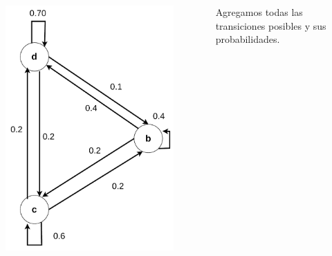 \documentclass[11pt]{beamer}
\begin{document}
\begin{frame}
	\begin{columns}
		\begin{column}{0.5\textwidth}
			\vspace{-0.5cm}
			\begin{figure}
				\includegraphics[scale=0.5]{images/markov_cuatro.pdf}
			\end{figure}
		\end{column}
		\begin{column}{0.5\textwidth}
			Agregamos todas las transiciones posibles y sus probabilidades.

		\end{column}

	\end{columns}
	
\end{frame}
\end{document}
